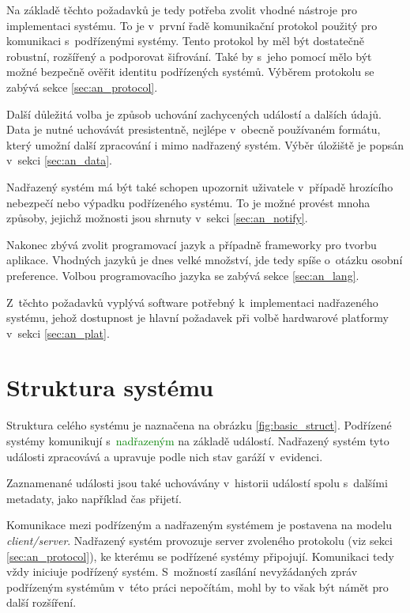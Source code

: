Na základě těchto požadavků je tedy potřeba zvolit vhodné nástroje pro implementaci systému. To je v~první řadě komunikační protokol použitý pro komunikaci s~podřízenými systémy. Tento protokol by měl být dostatečně robustní, rozšířený a podporovat šifrování. Také by s~jeho pomocí mělo být možné bezpečně ověřit identitu podřízených systémů. Výběrem protokolu se zabývá sekce \ref{sec:an_protocol}.

Další důležitá volba je způsob uchování zachycených událostí a dalších údajů. Data je nutné uchovávát presistentně, nejlépe v~obecně používaném formátu, který umožní další zpracování i mimo nadřazený systém. Výběr úložiště je popsán v~sekci \ref{sec:an_data}.

Nadřazený systém má být také schopen upozornit uživatele v~případě hrozícího nebezpečí nebo výpadku podřízeného systému. To je možné provést mnoha způsoby, jejichž možnosti jsou shrnuty v~sekci \ref{sec:an_notify}.

Nakonec zbývá zvolit programovací jazyk a případně frameworky pro tvorbu aplikace. Vhodných jazyků je dnes velké množství, jde tedy spíše o~otázku osobní preference. Volbou programovacího jazyka se zabývá sekce \ref{sec:an_lang}.

Z~těchto požadavků vyplývá software potřebný k~implementaci nadřazeného systému, jehož dostupnost je hlavní požadavek při volbě hardwarové platformy v~sekci \ref{sec:an_plat}. 

\section{Struktura systému}
\label{sec:an_struct}

Struktura celého systému je naznačena na obrázku \ref{fig:basic_struct}. \textcolor{blue2}{Podřízené systémy} komunikují s~\textcolor{green}{nadřazeným} na základě událostí. Nadřazený systém tyto události zpracovává a upravuje podle nich stav garáží v~evidenci. 

Zaznamenané události jsou také uchovávány v~historii událostí spolu s~dalšími metadaty, jako například čas přijetí.

Komunikace mezi podřízeným a nadřazeným systémem je postavena na modelu \textit{client/server}. Nadřazený systém provozuje server zvoleného protokolu (viz sekci \ref{sec:an_protocol}), ke kterému se podřízené systémy připojují. Komunikaci tedy vždy iniciuje podřízený systém. S~možností zasílání nevyžádaných zpráv podřízeným systémům v~této práci nepočítám, mohl by to však být námět pro další rozšíření.


